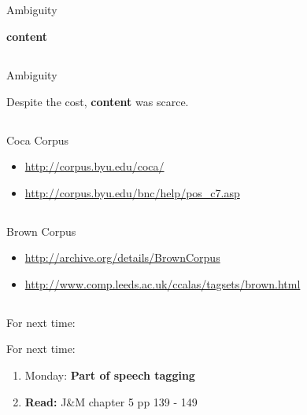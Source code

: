 \documentclass[9pt,xcolor=pdftex,dvipsnames,table]{beamer}
\begin{document}
\subsection{}
\begin{frame}{Ambiguity}
	\begin{center}
		{\huge \textbf{content}}
	\end{center}
\end{frame}

\subsection{}
\begin{frame}{Ambiguity}
	\begin{center}
		{\huge Despite the cost, \textbf{content} was scarce.}
	\end{center}
\end{frame}

\subsection{}
\begin{frame}{Coca Corpus}
	\begin{itemize}
		\item \url{http://corpus.byu.edu/coca/}
		\item \url{http://corpus.byu.edu/bnc/help/pos_c7.asp}
	\end{itemize}
\end{frame}

\subsection{}
\begin{frame}{Brown Corpus}
	\begin{itemize}
		\item \url{http://archive.org/details/BrownCorpus}
		\item \url{http://www.comp.leeds.ac.uk/ccalas/tagsets/brown.html}
	\end{itemize}
\end{frame}

\subsection{}
\begin{frame}{For next time:}

     \begin{block}{For next time:}
          \begin{enumerate}
          \item Monday: \textbf{Part of speech tagging}
          \item \textbf{Read:} J\&M chapter 5 pp 139 - 149
          \end{enumerate}
     \end{block}
\end{frame}
\end{document}
